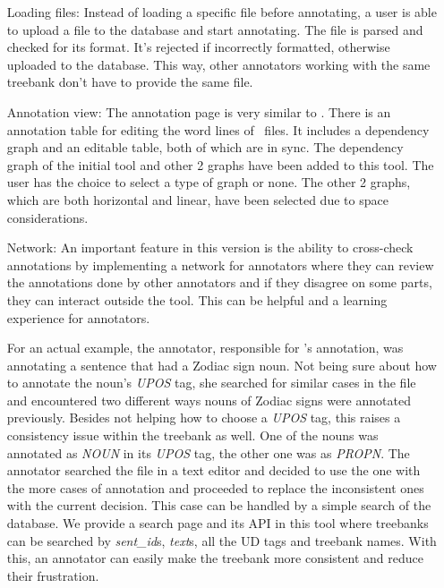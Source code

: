 \begin{itemize}[before=\normalfont, font=\itshape, align=left]
\item[Loading files:] Instead of loading a specific file before annotating, a user is able to upload a \conllu{} file to the database and start annotating.
The file is parsed and checked for its format. It's rejected if incorrectly formatted, otherwise uploaded to the database.
This way, other annotators working with the same treebank don't have to provide the same file.

\item[Annotation view:] The annotation page is very similar to \boatvone.
There is an annotation table for editing the word lines of \conllu\ files.
It includes a dependency graph and an editable table, both of which are in sync.
The dependency graph of the initial tool and other 2 graphs have been added to this tool.
The user has the choice to select a type of graph or none.
The other 2 graphs, which are both horizontal and linear, have been selected due to space considerations.

\item[Network:] An important feature in this version is the ability to cross-check annotations by implementing a network for annotators where they can review the annotations done by other annotators and if they disagree on some parts, they can interact outside the tool.
This can be helpful and a learning experience for annotators.

For an actual example, the annotator, responsible for \bountreebank{}'s annotation, was annotating a sentence that had a Zodiac sign noun.
Not being sure about how to annotate the noun's \textit{UPOS} tag, she searched for similar cases in the \conllu{} file and encountered two different ways nouns of Zodiac signs were annotated previously.
Besides not helping how to choose a \textit{UPOS} tag, this raises a consistency issue within the treebank as well.
One of the nouns was annotated as \textit{NOUN} in its \textit{UPOS} tag, the other one was as \textit{PROPN}.
The annotator searched the \conllu{} file in a text editor and decided to use the one with the more cases of annotation and proceeded to replace the inconsistent ones with the current decision.
This case can be handled by a simple search of the database.
We provide a search page and its API in this tool where treebanks can be searched by \textit{sent\_id}s, \textit{text}s, all the UD tags and treebank names.
With this, an annotator can easily make the treebank more consistent and reduce their frustration.


\end{itemize}
